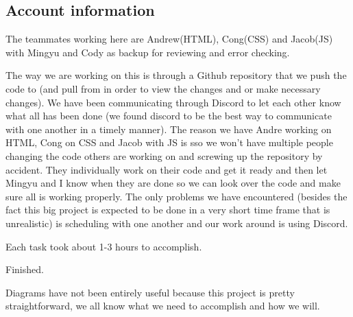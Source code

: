 \documentclass[12pt]{article}
\begin{document}
		\subsection{Account information}
		\begin{iterate}

		\item The teammates working here are Andrew(HTML), Cong(CSS) and Jacob(JS) with Mingyu and Cody as backup for reviewing and error checking.

		\item The way we are working on this is through a Github repository that we push the code to (and pull from in order to view the changes and or make necessary changes).  We have been communicating through Discord to let each other know what all has been done (we found discord to be the best way to communicate with one another in a timely manner).  The reason we have Andre working on HTML, Cong on CSS and Jacob with JS is sso we won’t have multiple people changing the code others are working on and screwing up the repository by accident.  They individually work on their code and get it ready and then let Mingyu and I know when they are done so we can look over the code and make sure all is working properly.  The only problems we have encountered (besides the fact this big project is expected to be done in a very short time frame that is unrealistic) is scheduling with one another and our work around is using Discord.

		\item Each task took about 1-3 hours to accomplish.

		\item Finished.

		\item Diagrams have not been entirely useful because this project is pretty straightforward, we all know what we need to accomplish and how we will.

		\end{iterate}
\end{document}
